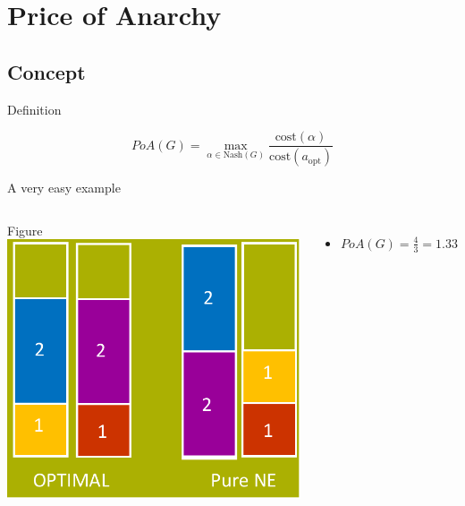 \documentclass{beamer}
\newcommand{\cost}{\text{cost}}
\newcommand{\Nash}{\text{Nash}}
\newcommand{\opt}{\text{opt}}
\begin{document}
\section{Price of Anarchy}
\subsection{Concept}
\begin{frame}{Definition}
\begin{definition}
$$PoA(G) = \displaystyle\max_{\alpha \in \Nash(G)} {\frac{\cost(\alpha)}{\cost(a_{\opt})}}$$
\end{definition}
\end{frame}


\begin{frame}{A very easy example}
\begin{columns}[t]
\column{5.3cm}
\begin{alertblock}{Figure}
\includegraphics[scale=0.5]{figuurpresentatie.pdf}
\end{alertblock}

\column{5.5cm}
\begin{itemize}
\item $PoA(G)= \frac{4}{3} = 1.33$
\end{itemize}
\end{columns}
\end{frame}
\end{document}
